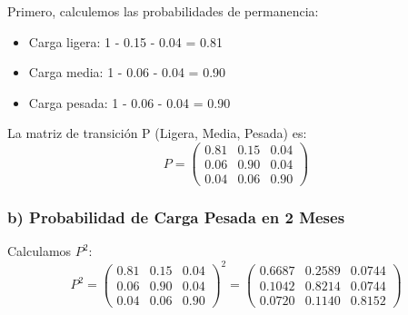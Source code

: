 \documentclass[12pt]{article}
\begin{document}
Primero, calculemos las probabilidades de permanencia:
\begin{itemize}
    \item Carga ligera: 1 - 0.15 - 0.04 = 0.81
    \item Carga media: 1 - 0.06 - 0.04 = 0.90
    \item Carga pesada: 1 - 0.06 - 0.04 = 0.90
\end{itemize}

La matriz de transición P (Ligera, Media, Pesada) es:
\[
P = \begin{pmatrix}
0.81 & 0.15 & 0.04 \\
0.06 & 0.90 & 0.04 \\
0.04 & 0.06 & 0.90
\end{pmatrix}
\]

\shorthandoff{>}
\begin{center}
\end{center}
\shorthandon{>}

\subsubsection{b) Probabilidad de Carga Pesada en 2 Meses}

Calculamos $P^2$:
\[
P^2 = \begin{pmatrix}
0.81 & 0.15 & 0.04 \\
0.06 & 0.90 & 0.04 \\
0.04 & 0.06 & 0.90
\end{pmatrix}^2 = \begin{pmatrix}
0.6687 & 0.2589 & 0.0744 \\
0.1042 & 0.8214 & 0.0744 \\
0.0720 & 0.1140 & 0.8152
\end{pmatrix}
\]
\end{document}
